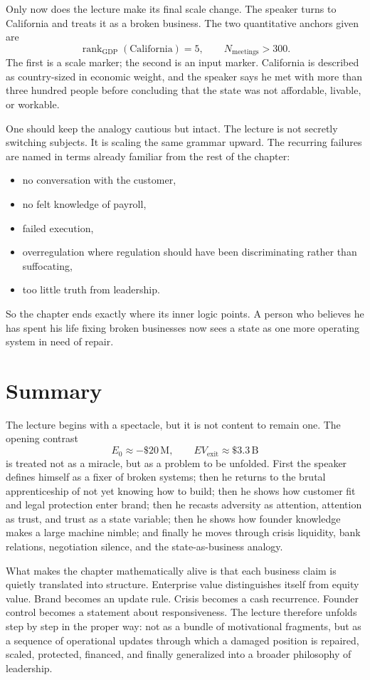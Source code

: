 Only now does the lecture make its final scale change. The speaker turns to California and treats it as a broken business. The two quantitative anchors given are
\begin{equation}
\operatorname{rank}_{\mathrm{GDP}}(\mathrm{California})=5,\qquad
N_{\mathrm{meetings}}>300.
\end{equation}
The first is a scale marker; the second is an input marker. California is described as country-sized in economic weight, and the speaker says he met with more than three hundred people before concluding that the state was not affordable, livable, or workable.

One should keep the analogy cautious but intact. The lecture is not secretly switching subjects. It is scaling the same grammar upward. The recurring failures are named in terms already familiar from the rest of the chapter:
\begin{itemize}
\item no conversation with the customer,
\item no felt knowledge of payroll,
\item failed execution,
\item overregulation where regulation should have been discriminating rather than suffocating,
\item too little truth from leadership.
\end{itemize}
So the chapter ends exactly where its inner logic points. A person who believes he has spent his life fixing broken businesses now sees a state as one more operating system in need of repair.

\section{Summary}

The lecture begins with a spectacle, but it is not content to remain one. The opening contrast
\[
E_0\approx -\$20\,\mathrm{M},\qquad EV_{\mathrm{exit}}\approx \$3.3\,\mathrm{B}
\]
is treated not as a miracle, but as a problem to be unfolded. First the speaker defines himself as a fixer of broken systems; then he returns to the brutal apprenticeship of not yet knowing how to build; then he shows how customer fit and legal protection enter brand; then he recasts adversity as attention, attention as trust, and trust as a state variable; then he shows how founder knowledge makes a large machine nimble; and finally he moves through crisis liquidity, bank relations, negotiation silence, and the state-as-business analogy.

What makes the chapter mathematically alive is that each business claim is quietly translated into structure. Enterprise value distinguishes itself from equity value. Brand becomes an update rule. Crisis becomes a cash recurrence. Founder control becomes a statement about responsiveness. The lecture therefore unfolds step by step in the proper way: not as a bundle of motivational fragments, but as a sequence of operational updates through which a damaged position is repaired, scaled, protected, financed, and finally generalized into a broader philosophy of leadership.